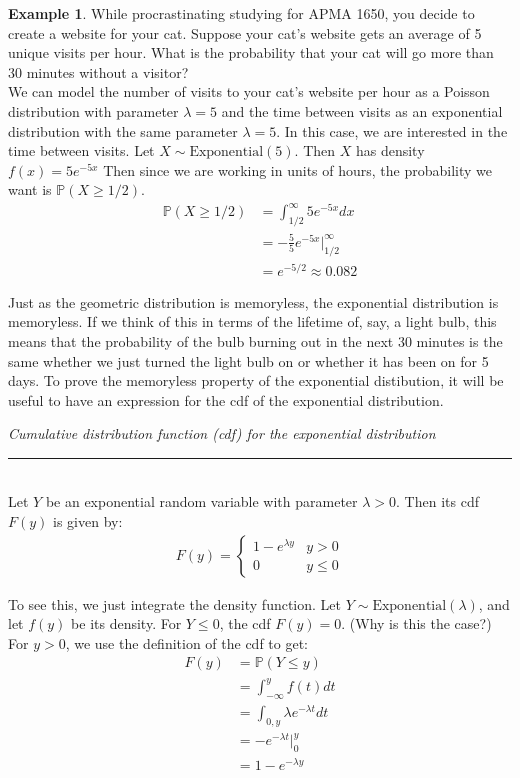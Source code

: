 \documentclass[12pt]{article}
\theoremstyle{definition}
\newtheorem*{example}{Example}
\theoremstyle{remark}
\def\P{{\mathbb P}}
\begin{document}
\begin{example}While procrastinating studying for APMA 1650, you decide to create a website for your cat. Suppose your cat's website gets an average of 5 unique visits per hour. What is the probability that your cat will go more than 30 minutes without a visitor?\\

We can model the number of visits to your cat's website per hour as a Poisson distribution with parameter $\lambda = 5$ and the time between visits as an exponential distribution with the same parameter $\lambda = 5$. In this case, we are interested in the time between visits. Let $X \sim \text{Exponential}(5)$. Then $X$ has density $f(x) = 5 e^{-5x}$
Then since we are working in units of hours, the probability we want is $\P(X \geq 1/2)$.
\begin{align*}
\P(X \geq 1/2) &= \int_{1/2}^{\infty} 5 e^{-5x} dx \\
&= -\frac{5}{5} e^{-5x}\Bigr|_{1/2}^\infty \\
&= e^{-5/2} \approx 0.082
\end{align*}
\end{example}

Just as the geometric distribution is memoryless, the exponential distribution is memoryless. If we think of this in terms of the lifetime of, say, a light bulb, this means that the probability of the bulb burning out in the next 30 minutes is the same whether we just turned the light bulb on or whether it has been on for 5 days. To prove the memoryless property of the exponential distibution, it will be useful to have an expression for the cdf of the exponential distribution.

\begin{framed}
\emph{Cumulative distribution function (cdf) for the exponential distribution}\\
  \rule{\dimexpr{}\fboxrule}{.1pt} \\
Let $Y$ be an exponential random variable with parameter $\lambda > 0$. Then its cdf $F(y)$ is given by:
\begin{align*}
F(y) = \begin{cases}
1 - e^{\lambda y} & y > 0 \\
0 & y \leq 0
\end{cases}
\end{align*}
\end{framed}
To see this, we just integrate the density function. Let $Y \sim\text{Exponential}(\lambda)$, and let $f(y)$ be its density. For $Y \leq 0$, the cdf $F(y) = 0$. (Why is this the case?) For $y > 0$, we use the definition of the cdf to get:
\begin{align*}
F(y) &= \P(Y \leq y) \\
&= \int_{-\infty}^y f(t) dt \\
&= \int_{0, y} \lambda e^{-\lambda t} dt \\
&= -e^{-\lambda t}\Bigr|_0^y \\
&= 1 - e^{-\lambda y}
\end{align*}
\end{document}
